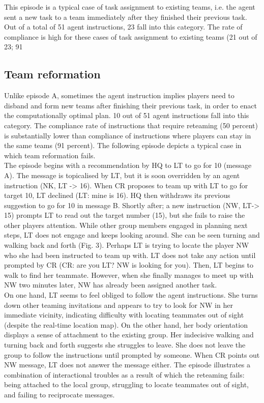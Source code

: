 This episode is a typical case of task assignment to existing teams, i.e. the agent sent a new task to a team immediately after they finished their previous task. Out of a total of 51 agent instructions, 23 fall into this category. The rate of compliance is high for these cases of task assignment to existing teams (21 out of 23; 91%

\subsection{Team reformation}
Unlike episode A, sometimes the agent instruction implies players need to disband and form new teams after finishing their previous task, in order to enact the computationally optimal plan. 10 out of 51 agent instructions fall into this category. The compliance rate of instructions that require reteaming (50 percent) is substantially lower than compliance of instructions where players can stay in the same teams (91 percent). The following episode depicts a typical case in which team reformation fails.\\

The episode begins with a recommendation by HQ to LT to go for 10 (message A). The message is topicalised by LT, but it is soon overridden by an agent instruction (NK, LT -> 16). When CR proposes to team up with LT to go for target 10, LT declined (LT: mine is 16). HQ then withdraws its previous suggestion to go for 10 in message B. Shortly after; a new instruction (NW, LT-> 15) prompts LT to read out the target number (15), but she fails to raise the other players attention. While other group members engaged in planning next steps, LT does not engage and keeps looking around. She can be seen turning and walking back and forth (Fig. 3). Perhaps LT is trying to locate the player NW who she had been instructed to team up with. LT does not take any action until prompted by CR (CR: are you LT? NW is looking for you). Then, LT begins to walk to find her teammate. However, when she finally manages to meet up with NW two minutes later, NW has already been assigned another task. \\

On one hand, LT seems to feel obliged to follow the agent instructions. She turns down other teaming invitations and appears to try to look for NW in her immediate vicinity, indicating difficulty with locating teammates out of sight (despite the real-time location map). On the other hand, her body orientation displays a sense of attachment to the existing group. Her indecisive walking and turning back and forth suggests she struggles to leave. She does not leave the group to follow the instructions until prompted by someone. When CR points out NW message, LT does not answer the message either. The episode illustrates a combination of interactional troubles as a result of which the reteaming fails: being attached to the local group, struggling to locate teammates out of sight, and failing to reciprocate messages. \\

